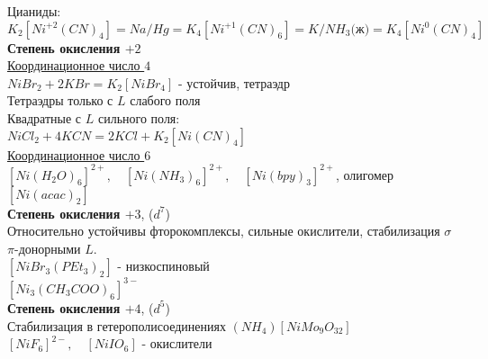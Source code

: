 Цианиды:
\[
K_2\left[Ni^{+2}(CN)_4 \right] = Na/Hg = K_4\left[Ni^{+1}(CN)_6 \right] = K/NH_3\text{(ж)} = K_4\left[Ni^{0}(CN)_4 \right]
\]
\textbf{Степень окисления $+2$}\\
\ul{Координационное число $4$} \\
$NiBr_2 + 2KBr = K_2\left[NiBr_4 \right]$ - устойчив, тетраэдр \\
Тетраэдры только с $L$ слабого поля \\
Квадратные с $L$ сильного поля: \\
$NiCl_2 + 4 KCN = 2 KCl + K_2\left[Ni(CN)_4 \right]$ \\
\ul{Координационное число $6$} \\
$\left[Ni(H_2O)_6 \right]^{2+}, \quad \left[Ni(NH_3)_6 \right]^{2+}, \quad \left[Ni(bpy)_3 \right]^{2+}$, олигомер $\left[Ni(acac)_2 \right]$ \\
\textbf{Степень окисления $+3$}, ($d^7$)\\
Относительно устойчивы фторокомплексы, сильные окислители, стабилизация $\sigma$ $\pi$-донорными $L$. \\
$ \left[NiBr_3(PEt_3)_2 \right] $ - низкоспиновый \\
$ \left[Ni_3(CH_3COO)_6 \right]^{3-} $ \\
\textbf{Степень окисления $+4$}, ($d^5$)\\
Стабилизация в гетерополисоединениях $(NH_4)\left[NiMo_9O_{32}\right]$ \\
$\left[NiF_6\right]^{2-}, \quad \left[NiIO_6\right]$ - окислители

